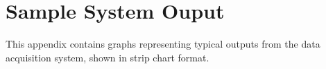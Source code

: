 \chapter{Sample System Ouput}
This appendix contains graphs representing typical outputs from the data acquisition system, shown in strip chart format.




